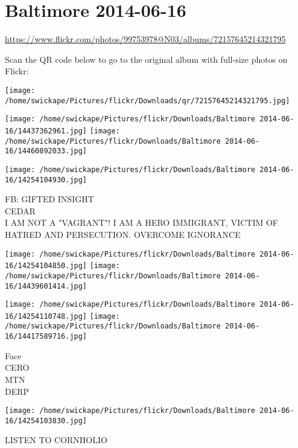 \documentclass[10pt,letterpaper]{article}
\title{}
\author{}
\date{}
\begin{document}
\section*{Baltimore 2014-06-16}

\url{https://www.flickr.com/photos/99753978@N03/albums/72157645214321795}

Scan the QR code below to go to the original album with full-size photos on Flickr:

\texttt{[image: /home/swickape/Pictures/flickr/Downloads/qr/72157645214321795.jpg]}
\pagebreak

\texttt{[image: /home/swickape/Pictures/flickr/Downloads/Baltimore 2014-06-16/14437362961.jpg]}
\texttt{[image: /home/swickape/Pictures/flickr/Downloads/Baltimore 2014-06-16/14460892033.jpg]}

\vspace{0.25in}
\texttt{[image: /home/swickape/Pictures/flickr/Downloads/Baltimore 2014-06-16/14254104930.jpg]}

FB: GIFTED INSIGHT\\
CEDAR\\
I AM NOT A "VAGRANT"!  I AM A HERO IMMIGRANT, VICTIM OF HATRED AND PERSECUTION.  OVERCOME IGNORANCE
\pagebreak

\texttt{[image: /home/swickape/Pictures/flickr/Downloads/Baltimore 2014-06-16/14254104850.jpg]}
\texttt{[image: /home/swickape/Pictures/flickr/Downloads/Baltimore 2014-06-16/14439601414.jpg]}

\texttt{[image: /home/swickape/Pictures/flickr/Downloads/Baltimore 2014-06-16/14254110748.jpg]}
\texttt{[image: /home/swickape/Pictures/flickr/Downloads/Baltimore 2014-06-16/14417589716.jpg]}

Face\\
CERO\\
MTN\\
DERP
\pagebreak

\texttt{[image: /home/swickape/Pictures/flickr/Downloads/Baltimore 2014-06-16/14254103830.jpg]}

LISTEN TO CORNHOLIO
\pagebreak
\end{document}

